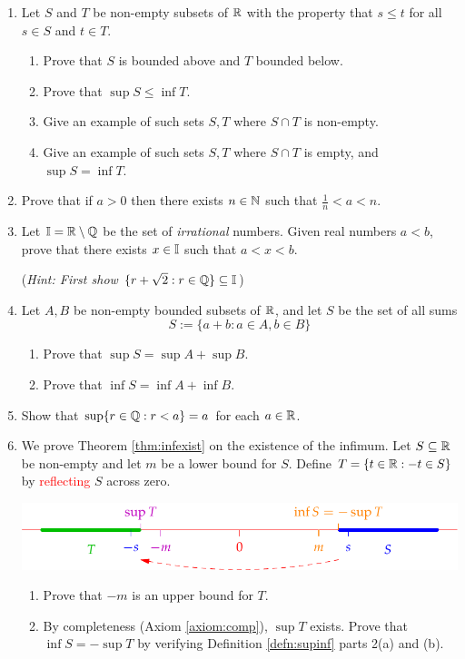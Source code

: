 \begin{exercises}{}{}
\begin{enumerate}
  
	  \item %
	  Let $S$ and $T$ be non-empty subsets of $\mathbb{R}$ with the property that $s\le t$ for all $s\in S$ and $t\in T$.
	  \begin{enumerate}
		  \item Prove that $S$ is bounded above and $T$ bounded below.
		  \item Prove that $\sup S\le \inf T$.
		  \item Give an example of such sets $S,T$ where $S\cap T$ is non-empty.
		  \item Give an example of such sets $S,T$ where $S\cap T$ is empty, and $\sup S=\inf T$.
	  \end{enumerate}
  
  
	  \item %
	  Prove that if $a>0$ then there exists $n\in\mathbb{N}$ such that $\frac 1n<a<n$.
	  
	
	  \item%
	  \label{exs:irrdense} Let $\mathbb{I}=\mathbb{R}\setminus\mathbb{Q}$ be the set of \emph{irrational} numbers. Given real numbers $a<b$, prove that there exists $x\in\mathbb{I}$ such that $a<x<b$.\par
	  (\emph{Hint: First show $\{r+\sqrt 2:r\in\mathbb{Q}\}\subseteq\mathbb{I}$})
  

  	\item %
  	Let $A, B$ be non-empty bounded subsets of $\mathbb{R}$, and let $S$ be the set of all sums
  	\[
  		S:=\{a+b:a\in A,b\in B\}
  	\]
	  \begin{enumerate}
		  \item Prove that $\sup S=\sup A+\sup B$.
		  \item Prove that $\inf S=\inf A+\inf B$.
	  \end{enumerate}
  

  	\item%
  	Show that $\sup\{r\in \mathbb{Q}:r<a\}=a$ for each $a\in\mathbb{R}$.
  
  
  	\item\label{exs:infexist} We prove Theorem \ref{thm:infexist} on the existence of the infimum.\smallbreak
	  Let $S\subseteq\mathbb{R}$ be non-empty and let $m$ be a lower bound for $S$. Define $T=\{t\in\mathbb{R}:-t\in S\}$ by \textcolor{red}{reflecting} $S$ across zero.
		\begin{center}
			\includegraphics{infexist2}
		\end{center}
		\begin{enumerate}
		  \item Prove that $-m$ is an upper bound for $T$.
			\item By completeness (Axiom \ref{axiom:comp}), $\sup T$ exists. Prove that $\inf S=-\sup T$ by verifying Definition \ref{defn:supinf} parts 2(a) and (b).
		\end{enumerate}
  
	\end{enumerate}
\end{exercises}



